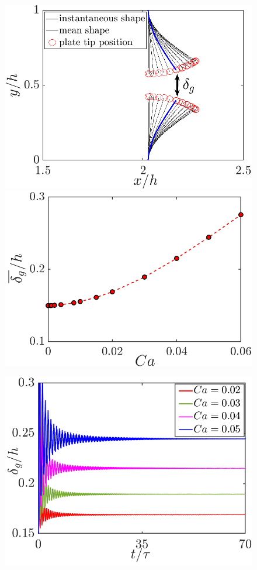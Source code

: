 \documentclass[final,3p,10pt,times,review,authoryear]{elsarticle}
\begin{document}
	\begin{figure}
	\begin{center}
		\begin{minipage}[c]{0.49\linewidth}	
			\includegraphics[width=1\linewidth]{Figures/def_shape2.png}\\
			\includegraphics[width=1\linewidth]{Figures/gap_signal/gap_steady2.png}
		\end{minipage}
		\begin{minipage}[c]{0.49\linewidth}	
			\includegraphics[width=1\linewidth]{Figures/gap_signal/gap_sig_3_4p1_5_5p1S-2.png}

\end{minipage}
\end{center}
\end{figure}
\end{document}
